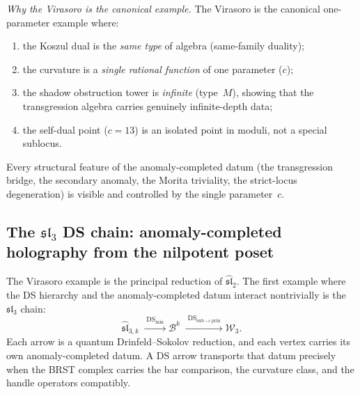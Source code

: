 \begin{computation}
\emph{Why the Virasoro is the canonical example.}
The Virasoro is the canonical one-parameter example where:
\begin{enumerate}[label=\textup{(\arabic*)}]
\item the Koszul dual is the \emph{same type} of algebra
 (same-family duality);
\item the curvature is a \emph{single rational function}
 of one parameter ($c$);
\item the shadow obstruction tower is \emph{infinite} (type~$M$),
 showing that the transgression algebra carries genuinely
 infinite-depth data;
\item the self-dual point ($c=13$) is an isolated point in
 moduli, not a special sublocus.
\end{enumerate}
Every structural feature of the anomaly-completed datum (the
transgression bridge, the secondary anomaly, the Morita
triviality, the strict-locus degeneration) is visible and
controlled by the single parameter~$c$.
\end{computation}

\subsection{The $\mathfrak{sl}_3$ DS chain:
anomaly-completed holography from the nilpotent poset}
\label{subsec:tholog-ds-chain}

The Virasoro example is the principal reduction of
$\widehat{\mathfrak{sl}}_2$. The first example where the
DS hierarchy and the anomaly-completed datum interact
nontrivially is the $\mathfrak{sl}_3$ chain:
\[
\widehat{\mathfrak{sl}}_{3,k}
\;\xrightarrow{\;\mathrm{DS}_{\min}\;}
\mathcal B^k
\;\xrightarrow{\;\mathrm{DS}_{\mathrm{sub}\to\mathrm{prin}}\;}
\mathcal W_3.
\]
Each arrow is a quantum Drinfeld--Sokolov reduction, and each
vertex carries its own anomaly-completed datum. A DS arrow transports
that datum precisely when the BRST complex carries the bar comparison,
the curvature class, and the handle operators compatibly.

